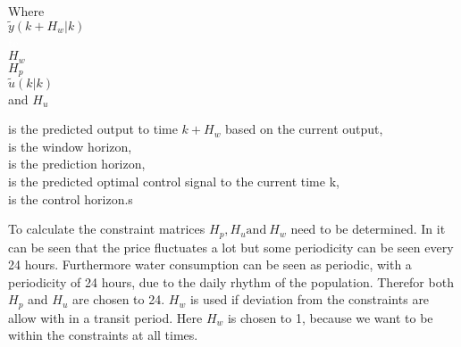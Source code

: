  \begin{minipage}[t]{0.20\textwidth}
 Where\\
 \hspace*{8mm} $\tilde y(k+H_w|k)$ \\
 \textcolor{White}{te} \\
 \hspace*{8mm} $H_w$ \\
 \hspace*{8mm} $H_p$ \\
 \hspace*{8mm} $\tilde u(k|k)$\\
 and \hspace*{0.7mm} $H_u$	
 \end{minipage}
 \begin{minipage}[t]{0.68\textwidth}
 \vspace*{2mm}
 is the predicted output to time $k+H_w$ based on the current output, \\
 is the window horizon,\\
 is the prediction horizon,\\
 is the predicted optimal control signal to the current time k, \\
 is the control horizon.s
 \end{minipage}

To calculate the constraint matrices $H_p, H_u \text{and} \: H_w$ need to be determined. In  it can be seen that the price fluctuates a lot but some periodicity can be seen every 24 hours. Furthermore water consumption can be seen as periodic, with a periodicity of 24 hours, due to the daily rhythm of the population. Therefor both $H_p$ and $ H_u $ are chosen to 24. $H_w$ is used if deviation from the constraints are allow with in a transit period. Here $H_w$ is chosen to 1, because we want to be within the constraints at all times. 




